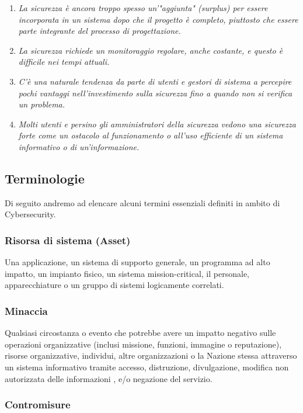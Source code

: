 \begin{enumerate}
    \item \textit{La sicurezza è ancora troppo spesso un'"aggiunta" (surplus) per essere incorporata in un sistema dopo che il progetto è completo, piuttosto che essere parte integrante del processo di progettazione.}
    \item \textit{La sicurezza richiede un monitoraggio regolare, anche costante, e questo è difficile nei tempi attuali.}
    \item \textit{C'è una naturale tendenza da parte di utenti e gestori di sistema a percepire pochi vantaggi nell'investimento sulla sicurezza fino a quando non si verifica un problema.}
    \item \textit{ Molti utenti e persino gli amministratori della sicurezza vedono una sicurezza forte come un ostacolo al funzionamento o all'uso efficiente di un sistema informativo o di un'informazione.}
\end{enumerate}

\subsection{Terminologie}

Di seguito andremo ad elencare alcuni termini essenziali definiti in ambito di Cybersecurity.

\subsubsection{Risorsa di sistema (Asset)}

Una applicazione, un sistema di supporto generale, un programma ad alto
impatto, un impianto fisico, un sistema
mission-critical, il personale, apparecchiature o un gruppo di sistemi logicamente
correlati.

\subsubsection{Minaccia}

Qualsiasi circostanza o evento che potrebbe avere un impatto negativo sulle
operazioni organizzative
(inclusi missione, funzioni, immagine o reputazione), risorse organizzative,
individui, altre organizzazioni o la
Nazione stessa attraverso un sistema informativo tramite accesso, distruzione,
divulgazione, modifica non autorizzata
delle informazioni , e/o negazione del servizio.

\subsubsection{Contromisure}

